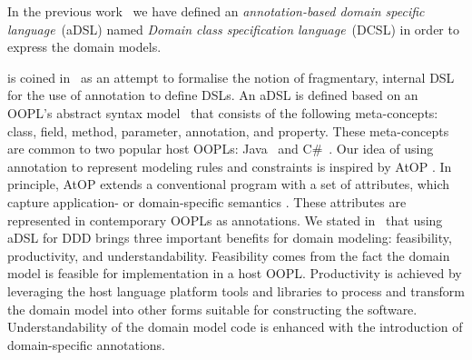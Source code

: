 In the previous work~\cite{le_domain_2018} we have defined an \textit{annotation-based domain specific language}~(aDSL) named \textit{Domain class specification language}~(DCSL) in order to express the domain models. 

 is coined in~\cite{nosal_language_2016} as an attempt to formalise the notion of fragmentary, internal DSL~\cite{fowler_domain-specific_2010} for the use of annotation to define DSLs. An aDSL is defined based on an OOPL's abstract syntax model~\cite{le_domain_2018} that consists of the following meta-concepts: class, field, method, parameter, annotation, and property. These meta-concepts are common to two popular host OOPLs: Java~\cite{gosling_java_2014} and C\#~\cite{hejlsberg_c_2010}. %
Our idea of using annotation to represent modeling rules and constraints is inspired by AtOP \cite{wada_modeling_2005, cepa_representing_2005,sulir_recording_2016,balz_embedding_2012}. In principle, AtOP extends a conventional program with a set of attributes, which capture application- or domain-specific semantics \cite{cepa_representing_2005}. These attributes are represented in contemporary OOPLs as annotations. 
%
We stated in~\cite{le_domain_2018} that using aDSL for DDD brings three important benefits for domain modeling: feasibility, productivity, and understandability. Feasibility comes from the fact the domain model is feasible for implementation in a host OOPL. Productivity is achieved by leveraging the host language platform tools and libraries to process and transform the domain model into other forms suitable for constructing the software. Understandability of the domain model code is enhanced with the introduction of domain-specific annotations.


